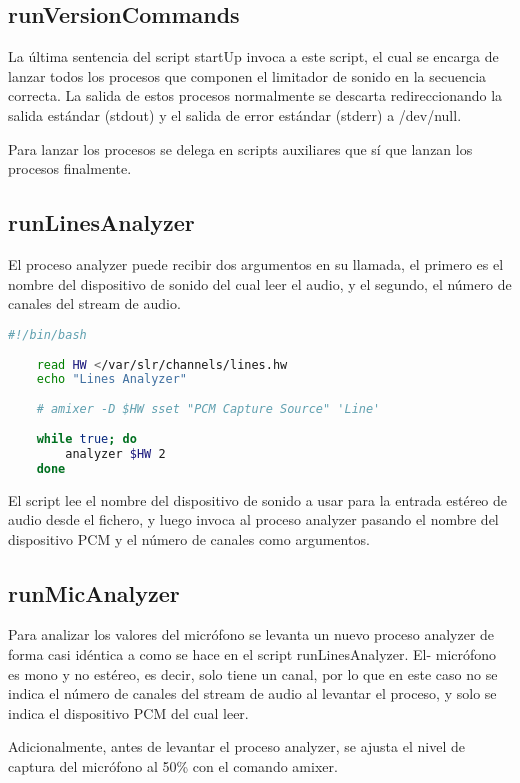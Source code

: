 \documentclass[]{article}
\begin{document}
\subsection{runVersionCommands}
La última sentencia del script startUp invoca a este script, el cual se encarga de lanzar todos los procesos que componen el limitador de sonido en la secuencia correcta. La salida de estos procesos normalmente se descarta redireccionando la salida estándar (stdout) y el salida de error estándar (stderr) a /dev/null.

Para lanzar los procesos se delega en scripts auxiliares que sí que lanzan los procesos finalmente.

\subsection{runLinesAnalyzer}
El proceso analyzer puede recibir dos argumentos en su llamada, el primero es el nombre del dispositivo de sonido del cual leer el audio, y el segundo, el número de canales del stream de audio.

\begin{lstlisting}[language=bash, caption=Script runLinesAnalyzer]
	#!/bin/bash
	
	read HW </var/slr/channels/lines.hw
	echo "Lines Analyzer"
	
	# amixer -D $HW sset "PCM Capture Source" 'Line'
	
	while true; do
		analyzer $HW 2
	done
\end{lstlisting}

El script lee el nombre del dispositivo de sonido a usar para la entrada estéreo de audio desde el fichero, y luego invoca al proceso analyzer pasando el nombre del dispositivo PCM y el número de canales como argumentos.

\subsection{runMicAnalyzer}
Para analizar los valores del micrófono se levanta un nuevo proceso analyzer de forma casi idéntica a como se hace en el script runLinesAnalyzer. El- micrófono es mono y no estéreo, es decir, solo tiene un canal, por lo que en este caso no se indica el número de canales del stream de audio al levantar el proceso, y solo se indica el dispositivo PCM del cual leer.

Adicionalmente, antes de levantar el proceso analyzer, se ajusta el nivel de captura del micrófono al 50\% con el comando amixer.
\end{document}
